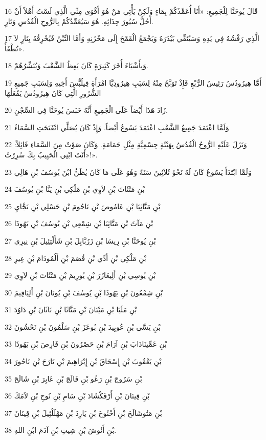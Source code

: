 \par 16 قَالَ يُوحَنَّا لِلْجَمِيعِ: «أَنَا أُعَمِّدُكُمْ بِمَاءٍ وَلَكِنْ يَأْتِي مَنْ هُوَ أَقْوَى مِنِّي الَّذِي لَسْتُ أَهْلاً أَنْ أَحُلَّ سُيُورَ حِذَائِهِ. هُوَ سَيُعَمِّدُكُمْ بِالرُّوحِ الْقُدُسِ وَنَارٍ.
\par 17 الَّذِي رَفْشُهُ فِي يَدِهِ وَسَيُنَقِّي بَيْدَرَهُ وَيَجْمَعُ الْقَمْحَ إِلَى مَخْزَنِهِ وَأَمَّا التِّبْنُ فَيُحْرِقُهُ بِنَارٍ لاَ تُطْفَأُ».
\par 18 وَبِأَشْيَاءَ أُخَرَ كَثِيرَةٍ كَانَ يَعِظُ الشَّعْبَ وَيُبَشِّرُهُمْ.
\par 19 أَمَّا هِيرُودُسُ رَئِيسُ الرُّبْعِ فَإِذْ تَوَبَّخَ مِنْهُ لِسَبَبِ هِيرُودِيَّا امْرَأَةِ فِيلُبُّسَ أَخِيهِ وَلِسَبَبِ جَمِيعِ الشُّرُورِ الَّتِي كَانَ هِيرُودُسُ يَفْعَلُهَا
\par 20 زَادَ هَذَا أَيْضاً عَلَى الْجَمِيعِ أَنَّهُ حَبَسَ يُوحَنَّا فِي السِّجْنِ.
\par 21 وَلَمَّا اعْتَمَدَ جَمِيعُ الشَّعْبِ اعْتَمَدَ يَسُوعُ أَيْضاً. وَإِذْ كَانَ يُصَلِّي انْفَتَحَتِ السَّمَاءُ
\par 22 وَنَزَلَ عَلَيْهِ الرُّوحُ الْقُدُسُ بِهَيْئَةٍ جِسْمِيَّةٍ مِثْلِ حَمَامَةٍ. وَكَانَ صَوْتٌ مِنَ السَّمَاءِ قَائِلاً: «أَنْتَ ابْنِي الْحَبِيبُ بِكَ سُرِرْتُ!».
\par 23 وَلَمَّا ابْتَدَأَ يَسُوعُ كَانَ لَهُ نَحْوُ ثَلاَثِينَ سَنَةً وَهُوَ عَلَى مَا كَانَ يُظَنُّ ابْنَ يُوسُفَ بْنِ هَالِي
\par 24 بْنِ مَتْثَاتَ بْنِ لاَوِي بْنِ مَلْكِي بْنِ يَنَّا بْنِ يُوسُفَ
\par 25 بْنِ مَتَّاثِيَا بْنِ عَامُوصَ بْنِ نَاحُومَ بْنِ حَسْلِي بْنِ نَجَّايِ
\par 26 بْنِ مَآثَ بْنِ مَتَّاثِيَا بْنِ شِمْعِي بْنِ يُوسُفَ بْنِ يَهُوذَا
\par 27 بْنِ يُوحَنَّا بْنِ رِيسَا بْنِ زَرُبَّابِلَ بْنِ شَأَلْتِئِيلَ بْنِ نِيرِي
\par 28 بْنِ مَلْكِي بْنِ أَدِّي بْنِ قُصَمَ بْنِ أَلْمُودَامَ بْنِ عِيرِ
\par 29 بْنِ يُوسِي بْنِ أَلِيعَازَرَ بْنِ يُورِيمَ بْنِ مَتْثَاتَ بْنِ لاَوِي
\par 30 بْنِ شِمْعُونَ بْنِ يَهُوذَا بْنِ يُوسُفَ بْنِ يُونَانَ بْنِ أَلِيَاقِيمَ
\par 31 بْنِ مَلَيَا بْنِ مَيْنَانَ بْنِ مَتَّاثَا بْنِ نَاثَانَ بْنِ دَاوُدَ
\par 32 بْنِ يَسَّى بْنِ عُوبِيدَ بْنِ بُوعَزَ بْنِ سَلْمُونَ بْنِ نَحْشُونَ
\par 33 بْنِ عَمِّينَادَابَ بْنِ آرَامَ بْنِ حَصْرُونَ بْنِ فَارِصَ بْنِ يَهُوذَا
\par 34 بْنِ يَعْقُوبَ بْنِ إِسْحَاقَ بْنِ إِبْرَاهِيمَ بْنِ تَارَحَ بْنِ نَاحُورَ
\par 35 بْنِ سَرُوجَ بْنِ رَعُو بْنِ فَالَجَ بْنِ عَابِرَ بْنِ شَالَحَ
\par 36 بْنِ قِينَانَ بْنِ أَرْفَكْشَادَ بْنِ سَامِ بْنِ نُوحِ بْنِ لاَمَكَ
\par 37 بْنِ مَتُوشَالَحَ بْنِ أَخْنُوخَ بْنِ يَارِدَ بْنِ مَهْلَلْئِيلَ بْنِ قِينَانَ
\par 38 بْنِ أَنُوشَ بْنِ شِيتِ بْنِ آدَمَ ابْنِ اللهِ.

